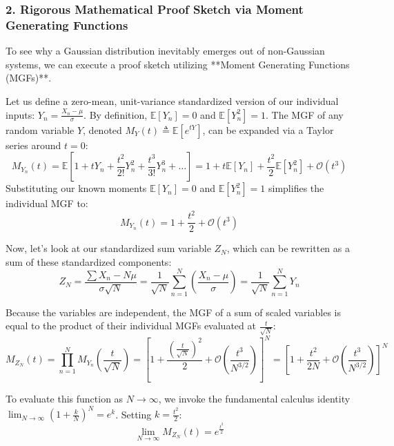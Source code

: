 \documentclass{article}
\begin{document}
\subsubsection*{2. Rigorous Mathematical Proof Sketch via Moment Generating Functions}

To see why a Gaussian distribution inevitably emerges out of non-Gaussian systems, we can execute a proof sketch utilizing **Moment Generating Functions (MGFs)**. 

Let us define a zero-mean, unit-variance standardized version of our individual inputs: $Y_n = \frac{X_n - \mu}{\sigma}$. By definition, $\mathbb{E}[Y_n] = 0$ and $\mathbb{E}[Y_n^2] = 1$. The MGF of any random variable $Y$, denoted $M_Y(t) \triangleq \mathbb{E}[e^{tY}]$, can be expanded via a Taylor series around $t=0$:
\begin{equation*}
M_{Y_n}(t) = \mathbb{E}\left[ 1 + tY_n + \frac{t^2}{2!}Y_n^2 + \frac{t^3}{3!}Y_n^3 + \dots \right] = 1 + t\mathbb{E}[Y_n] + \frac{t^2}{2}\mathbb{E}[Y_n^2] + \mathcal{O}(t^3)
\end{equation*}
Substituting our known moments $\mathbb{E}[Y_n]=0$ and $\mathbb{E}[Y_n^2]=1$ simplifies the individual MGF to:
\begin{equation}
M_{Y_n}(t) = 1 + \frac{t^2}{2} + \mathcal{O}(t^3) \tag{235}
\end{equation}

Now, let's look at our standardized sum variable $Z_N$, which can be rewritten as a sum of these standardized components:
\begin{equation*}
Z_N = \frac{\sum X_n - N\mu}{\sigma \sqrt{N}} = \frac{1}{\sqrt{N}}\sum_{n=1}^N \left(\frac{X_n - \mu}{\sigma}\right) = \frac{1}{\sqrt{N}}\sum_{n=1}^N Y_n
\end{equation*}

Because the variables are independent, the MGF of a sum of scaled variables is equal to the product of their individual MGFs evaluated at $\frac{t}{\sqrt{N}}$:
\begin{equation}
M_{Z_N}(t) = \prod_{n=1}^N M_{Y_n}\left(\frac{t}{\sqrt{N}}\right) = \left[ 1 + \frac{\left(\frac{t}{\sqrt{N}}\right)^2}{2} + \mathcal{O}\left(\frac{t^3}{N^{3/2}}\right) \right]^N = \left[ 1 + \frac{t^2}{2N} + \mathcal{O}\left(\frac{t^3}{N^{3/2}}\right) \right]^N \tag{236}
\end{equation}

To evaluate this function as $N \to \infty$, we invoke the fundamental calculus identity $\lim_{N\to\infty} \left(1 + \frac{k}{N}\right)^N = e^k$. Setting $k = \frac{t^2}{2}$:
\begin{equation}
\lim_{N \to \infty} M_{Z_N}(t) = e^{\frac{t^2}{2}} \tag{237}
\end{equation}
\end{document}
